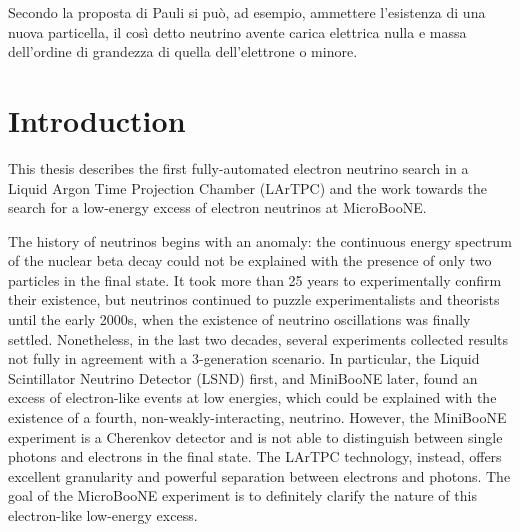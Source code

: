 \begin{savequote}[8cm]
 Secondo la proposta di Pauli si può, ad esempio, ammettere l'esistenza di una nuova particella, il così detto neutrino avente carica elettrica nulla e massa dell'ordine di grandezza di quella dell'elettrone o minore.
\end{savequote}

\chapter{\label{ch:1-intro}Introduction} 

This thesis describes the first fully-automated electron neutrino search in a Liquid Argon Time Projection Chamber (LArTPC) and the work towards the search for a low-energy excess of electron neutrinos at MicroBooNE.

The history of neutrinos begins with an anomaly: the continuous energy spectrum of the nuclear beta decay could not be explained with the presence of only two particles in the final state. It took more than 25 years to experimentally confirm their existence, but neutrinos continued to puzzle experimentalists and theorists until the early 2000s, when the existence of neutrino oscillations was finally settled. 
Nonetheless, in the last two decades, several experiments collected results not fully in agreement with a 3-generation scenario.
In particular, the Liquid Scintillator Neutrino Detector (LSND) first, and MiniBooNE later, found an excess of electron-like events at low energies, which could be explained with the existence of a fourth, non-weakly-interacting, neutrino. However, the MiniBooNE experiment is a Cherenkov detector and is not able to distinguish between single photons and electrons in the final state. The LArTPC technology, instead, offers excellent granularity and powerful separation between electrons and photons. The goal of the MicroBooNE experiment is to definitely clarify the nature of this electron-like low-energy excess.

